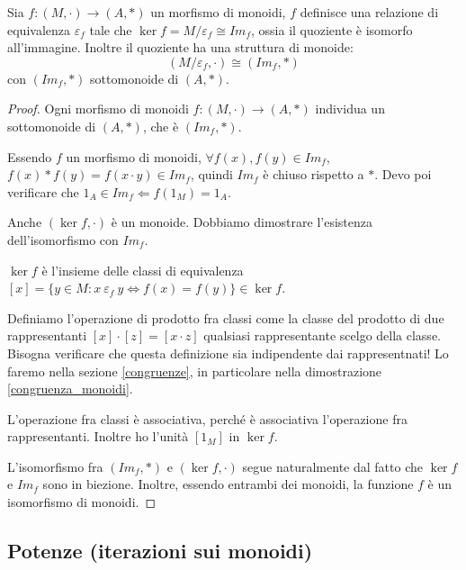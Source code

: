 \begin{prop}
Sia $f : (M, \cdot) \to (A, \ast)$ un morfismo di monoidi, $f$ definisce una relazione di equivalenza $\varepsilon_f$ tale che $\ker f = M / \varepsilon_f \cong Im_f$, ossia il quoziente \`e isomorfo all'immagine. Inoltre il quoziente ha una struttura di monoide:
\[
(M / \varepsilon_f , \cdot) \cong (Im_f, \ast)
\]
con $(Im_f, \ast)$ sottomonoide di $(A, \ast)$.
\end{prop}
\begin{proof}
Ogni morfismo di monoidi $f : (M, \cdot) \to (A, \ast)$ individua un sottomonoide di $(A, \ast)$, che \`e $(Im_f, \ast)$. 

Essendo $f$ un morfismo di monoidi, $\forall f(x), f(y) \in Im_f$, $f(x) \ast f(y) = f(x \cdot y) \in Im_f$, quindi $Im_f $ \`e chiuso rispetto a $\ast$. Devo poi verificare che $1_A \in Im_f \Leftarrow f(1_M) = 1_A$.

Anche $(\ker f, \cdot)$ \`e un monoide. Dobbiamo dimostrare l'esistenza dell'isomorfismo con $Im_f$.

$\ker f$ \`e l'insieme delle classi di equivalenza $[x] = \{ y \in M : x \ \varepsilon_f \ y \Leftrightarrow f(x) = f(y) \} \in \ker f$.

Definiamo l'operazione di prodotto fra classi come la classe del prodotto di due rappresentanti $[x] \cdot [z] = [x \cdot z]$ qualsiasi rappresentante scelgo della classe. Bisogna verificare che questa definizione sia indipendente dai rappresentnati! Lo faremo nella sezione \ref{congruenze}, in particolare nella dimostrazione \ref{congruenza_monoidi}. 

L'operazione fra classi \`e associativa, perch\'e \`e associativa l'operazione fra rappresentanti. Inoltre ho l'unit\`a $[1_M]$ in $\ker f$.

L'isomorfismo fra $(Im_f, \ast)$ e $(\ker f, \cdot)$ segue naturalmente dal fatto che $\ker f $ e $Im_f$ sono in biezione. Inoltre, essendo entrambi dei monoidi, la funzione $f$ \`e un isomorfismo di monoidi.
\end{proof}

\subsection{Potenze (iterazioni sui monoidi)}

